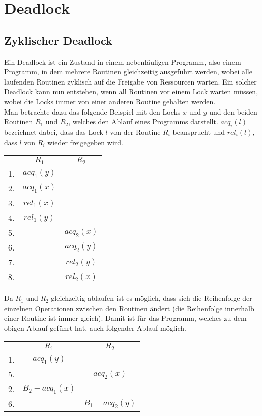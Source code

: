 \section{Deadlock} \label{Kap::Theo:Deadlocks}
\subsection{Zyklischer Deadlock}
Ein Deadlock ist ein Zustand in einem nebenläufigen Programm, also einem 
Programm, in dem mehrere Routinen gleichzeitig ausgeführt werden, wobei alle 
laufenden Routinen zyklisch auf die Freigabe von Ressourcen warten.
Ein solcher Deadlock kann nun entstehen, wenn all Routinen vor einem Lock warten 
müssen, wobei die Locks immer von einer anderen Routine gehalten werden.\\
Man betrachte dazu das folgende Beispiel \cite{sulzmann} mit den Locks $x$ und $y$ 
und den beiden Routinen $R_1$ und $R_2$, welches den Ablauf eines Programms 
darstellt. $acq_i(l)$ bezeichnet dabei, dass das Lock $l$ von der Routine $R_i$ 
beansprucht und $rel_i(l)$, dass $l$ von $R_i$ wieder freigegeben wird.
\begin{table}[H]
    \centering
    \begin{tabular}{ccc}
       & $R_1$        & $R_2$          \\
    1. & $acq_{1}(y)$ &                \\
    2. & $acq_{1}(x)$ &                \\
    3. & $rel_{1}(x)$ &                \\
    4. & $rel_{1}(y)$ &                \\
    5. &              & $acq_{2}(x)$ \\
    6. &              & $acq_{2}(y)$ \\
    7. &              & $rel_{2}(y)$ \\
    8. &              & $rel_{2}(x)$
    \end{tabular}
\end{table}
Da $R_1$ und $R_2$ gleichzeitig ablaufen ist es möglich, dass sich die 
Reihenfolge der einzelnen Operationen zwischen den Routinen ändert (die Reihenfolge
innerhalb einer Routine ist immer gleich). Damit ist für das Programm, welches 
zu dem obigen Ablauf geführt hat, auch folgender Ablauf möglich. 
\begin{table}[H]
    \centering
    \begin{tabular}{ccc}
       & $R_1$          & $R_2$          \\
    1. & $acq_{1}(y)$ &                \\
    5. &                & $acq_{2}(x)$ \\
    2. & $B_2-acq_{1}(x)$ &                \\
    6. &                & $B_1-acq_{2}(y)$
    \end{tabular}
\end{table}
